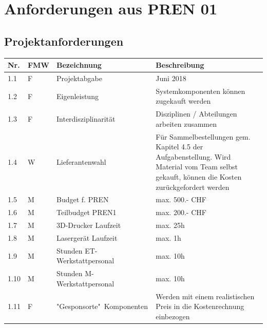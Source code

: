 \documentclass[a4paper]{report}
\begin{document}


\chapter{Anforderungen aus PREN 01}
\label{app:ch:Anforderungen}
\section{Projektanforderungen}
\label{app:sec:ProjektAnf}
\begin{tabular}{|p{}|p{}|p{}|p{}|}
	\hline
	\textbf{Nr.} & \textbf{FMW\footnotemark} & \textbf{Bezeichnung} & \textbf{Beschreibung} \\
	\hline
	1.1 & F & Projektabgabe & Juni 2018 \\
	\hline
	1.2 & F & Eigenleistung & Systemkomponenten können zugekauft werden \\
	\hline
	1.3 & F & Interdisziplinarität & Disziplinen / Abteilungen arbeiten zusammen \\
	\hline
	1.4 & W & Lieferantenwahl & Für Sammelbestellungen gem. Kapitel 4.5 der Aufgabenstellung. Wird Material vom Team selbst gekauft, können die Kosten zurückgefordert werden \\
	\hline
	1.5 & M & Budget f. PREN & max. 500.- CHF \\
	\hline
	1.6 & M & Teilbudget PREN1 & max. 200.- CHF \\
	\hline
	1.7 & M & 3D-Drucker Laufzeit & max. 25h \\
	\hline
	1.8 & M & Lasergerät Laufzeit & max. 1h \\
	\hline
	1.9 & M & Stunden ET-Werkstattpersonal & max. 10h \\
	\hline
	1.10 & M & Stunden M-Werkstattpersonal & max. 10h \\
	\hline
	1.11 & F & "Gesponsorte"\ Komponenten & Werden mit einem realistischen Preis in die Kostenrechnung einbezogen \\
	\hline
\end{tabular}
\end{document}
